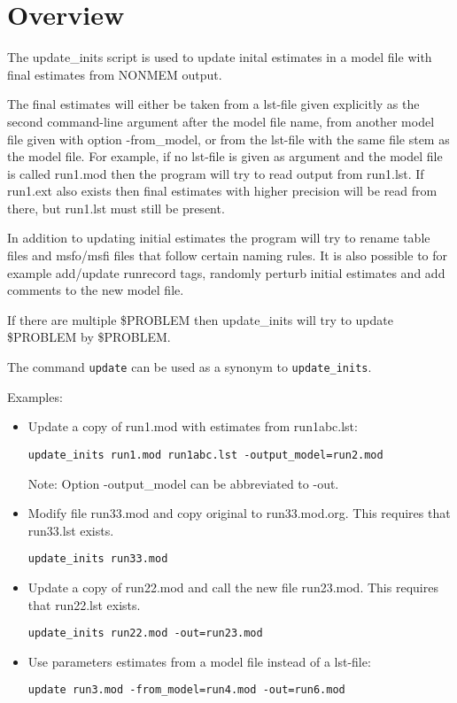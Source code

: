 
\setlength{\evensidemargin}{0pt}
\setlength{\oddsidemargin}{0pt}




\maketitle


\section{Overview}
The update\_inits script is used to update inital estimates in a model file with final
estimates from NONMEM output.

The final estimates will either be taken from a lst-file given explicitly as the second 
command-line argument after the model file name, from another model file given with option -from\_model, 
or from the lst-file with the same file stem as the model file.
For example, if no lst-file is given as argument and the model file is called run1.mod then the program will try to read output from
run1.lst. If run1.ext also exists then final estimates with higher precision will be read from there, 
but run1.lst must still be present.

In addition to updating initial estimates the program will try to rename table files and
msfo/msfi files that follow certain naming rules. It is also possible to for example
add/update runrecord tags,
randomly perturb initial estimates and add comments to the new model file.

If there are multiple \$PROBLEM then update\_inits will try to update \$PROBLEM by \$PROBLEM.

The command \verb|update| can be used as a synonym to \verb|update_inits|.

\noindent Examples:
\begin{itemize}
\item Update a copy of run1.mod with estimates from run1abc.lst:
\begin{verbatim}
update_inits run1.mod run1abc.lst -output_model=run2.mod
\end{verbatim}
Note: Option -output\_model can be abbreviated to -out.
\item Modify file run33.mod and copy original to run33.mod.org. This requires that run33.lst exists.
\begin{verbatim}
update_inits run33.mod
\end{verbatim}
\item Update a copy of run22.mod and call the new file run23.mod. This requires that run22.lst exists.
\begin{verbatim}
update_inits run22.mod -out=run23.mod
\end{verbatim}
\item Use parameters estimates from a model file instead of a lst-file:
\begin{verbatim}
update run3.mod -from_model=run4.mod -out=run6.mod
\end{verbatim}
\end{itemize}

